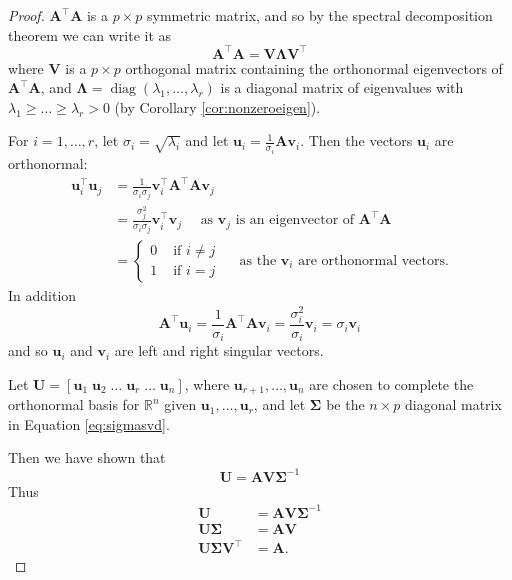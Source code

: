 \documentclass[
]{book}
\theoremstyle{definition}
\theoremstyle{definition}
\theoremstyle{definition}
\theoremstyle{definition}
\theoremstyle{remark}
\begin{document}
\begin{proof}
\(\mathbf A^\top \mathbf A\) is a \(p\times p\) symmetric matrix, and so by the spectral decomposition theorem we can write it as \[\mathbf A^\top \mathbf A= \mathbf V\boldsymbol \Lambda\mathbf V^\top\]
where \(\mathbf V\) is a \(p \times p\) orthogonal matrix containing the orthonormal eigenvectors of \(\mathbf A^\top \mathbf A\), and \(\boldsymbol \Lambda=\operatorname{diag}(\lambda_1, \ldots, \lambda_r)\) is a diagonal matrix of eigenvalues with \(\lambda_1\geq \ldots \geq\lambda_r>0\) (by Corollary \ref{cor:nonzeroeigen}).

For \(i=1,\dots, r\), let \(\sigma_i =\sqrt{\lambda_i}\) and let \(\mathbf u_i = \frac{1}{\sigma_i} \mathbf A\mathbf v_i\). Then the vectors \(\mathbf u_i\) are orthonormal:
\begin{align*}
\mathbf u_i^\top \mathbf u_j &=\frac{1}{\sigma_i\sigma_j} \mathbf v_i^\top \mathbf A^\top\mathbf A\mathbf v_j\\
&=\frac{\sigma_j^2}{\sigma_i\sigma_j} \mathbf v_i^\top\mathbf v_j \quad \mbox{ as }\mathbf v_j \mbox{ is an eigenvector of } \mathbf A^\top\mathbf A\\
&=\begin{cases}
0 &\mbox{ if } i\not=j\\
1 &\mbox{ if } i=j
\end{cases}\quad \mbox{ as the } \mathbf v_i \mbox{ are orthonormal vectors.}
\end{align*}
In addition
\[\mathbf A^\top\mathbf u_i = \frac{1}{\sigma_i}\mathbf A^\top\mathbf A\mathbf v_i = \frac{\sigma^2_i}{\sigma_i}\mathbf v_i = \sigma_i\mathbf v_i\]
and so \(\mathbf u_i\) and \(\mathbf v_i\) are left and right singular vectors.

Let \(\mathbf U=[\mathbf u_1 \; \mathbf u_2 \; \ldots \; \mathbf u_r\; \ldots \; \mathbf u_n]\), where \(\mathbf u_{r+1}, \ldots, \mathbf u_n\) are chosen to complete the orthonormal basis for \(\mathbb{R}^n\) given \(\mathbf u_1, \ldots, \mathbf u_r\), and
let \(\boldsymbol{\Sigma}\) be the \(n\times p\) diagonal matrix in Equation \eqref{eq:sigmasvd}.

Then we have shown that
\[\mathbf U= \mathbf A\mathbf V\boldsymbol{\Sigma}^{-1}\]
Thus
\begin{align*}
\mathbf U&= \mathbf A\mathbf V\boldsymbol{\Sigma}^{-1}\\
\mathbf U\boldsymbol{\Sigma}&= \mathbf A\mathbf V\\
\mathbf U\boldsymbol{\Sigma}\mathbf V^\top &= \mathbf A.
\end{align*}
\end{proof}
\end{document}
